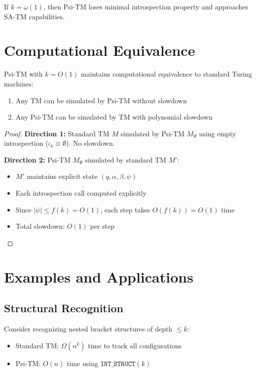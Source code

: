 \documentclass[11pt]{article}
\begin{document}
\begin{corollary}
If $k = \omega(1)$, then Psi-TM loses minimal introspection property and approaches SA-TM capabilities.
\end{corollary}

\section{Computational Equivalence}

\begin{theorem}
\label{thm:equivalence}
Psi-TM with $k = O(1)$ maintains computational equivalence to standard Turing machines:
\begin{enumerate}
\item Any TM can be simulated by Psi-TM without slowdown
\item Any Psi-TM can be simulated by TM with polynomial slowdown
\end{enumerate}
\end{theorem}

\begin{proof}
\textbf{Direction 1:} Standard TM $M$ simulated by Psi-TM $M_\Psi$ using empty introspection ($\iota_k \equiv \emptyset$). No slowdown.

\textbf{Direction 2:} Psi-TM $M_\Psi$ simulated by standard TM $M'$:
\begin{itemize}
\item $M'$ maintains explicit state $(q, \alpha, \beta, \psi)$ 
\item Each introspection call computed explicitly
\item Since $|\psi| \leq f(k) = O(1)$, each step takes $O(f(k)) = O(1)$ time
\item Total slowdown: $O(1)$ per step
\end{itemize}
\end{proof}

\section{Examples and Applications}

\subsection{Structural Recognition}

\begin{example}
Consider recognizing nested bracket structures of depth $\leq k$:
\begin{itemize}
\item Standard TM: $\Omega(n^k)$ time to track all configurations
\item Psi-TM: $O(n)$ time using $\texttt{INT\_STRUCT}(k)$
\end{itemize}
\end{example}
\end{document}
